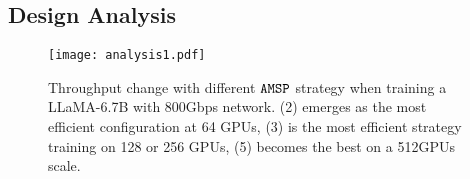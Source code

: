 







\subsection{Design Analysis}
\label{sec:design-analysis}

\begin{figure}[t]
    \centering
    \texttt{[image: analysis1.pdf]}
    \caption{Throughput change with different $\texttt{AMSP}$ strategy when training a LLaMA-6.7B with 800Gbps network. \SysName(2) emerges as the most efficient configuration at 64 GPUs, \SysName(3) is the most efficient strategy training on 128 or 256 GPUs, \SysName(5) becomes the best on a 512GPUs scale.}
    \label{analysis1}
\end{figure}

